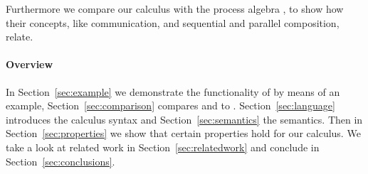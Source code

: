 Furthermore we compare our calculus with the process algebra \CSP, to show how their concepts, like communication, and sequential and parallel composition, relate.


\paragraph{Overview} In Section~\ref{sec:example} we demonstrate the
functionality of \TOPHAT by means of an example, Section~\ref{sec:comparison}
compares \TOP and \TOPHAT to \CSP. Section~\ref{sec:language} introduces the
\TOPHAT calculus syntax and Section~\ref{sec:semantics} the semantics. Then in
Section~\ref{sec:properties} we show that certain properties hold for our
calculus. We take a look at related work in
Section~\ref{sec:relatedwork} and conclude in Section~\ref{sec:conclusions}.
